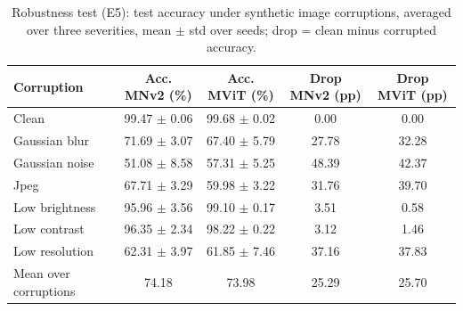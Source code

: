\begin{table}[!t]
\centering
\footnotesize
\caption{Robustness test (E5): test accuracy under synthetic image corruptions, averaged over three severities, mean $\pm$ std over seeds; drop = clean minus corrupted accuracy.}
\label{tab:robust}
\begin{tabular}{lcccc}
\toprule
Corruption & Acc. MNv2 (\%) & Acc. MViT (\%) & Drop MNv2 (pp) & Drop MViT (pp) \\
\midrule
Clean & 99.47 $\pm$ 0.06 & 99.68 $\pm$ 0.02 & 0.00 & 0.00 \\
Gaussian blur & 71.69 $\pm$ 3.07 & 67.40 $\pm$ 5.79 & 27.78 & 32.28 \\
Gaussian noise & 51.08 $\pm$ 8.58 & 57.31 $\pm$ 5.25 & 48.39 & 42.37 \\
Jpeg & 67.71 $\pm$ 3.29 & 59.98 $\pm$ 3.22 & 31.76 & 39.70 \\
Low brightness & 95.96 $\pm$ 3.56 & 99.10 $\pm$ 0.17 & 3.51 & 0.58 \\
Low contrast & 96.35 $\pm$ 2.34 & 98.22 $\pm$ 0.22 & 3.12 & 1.46 \\
Low resolution & 62.31 $\pm$ 3.97 & 61.85 $\pm$ 7.46 & 37.16 & 37.83 \\
Mean over corruptions & 74.18 & 73.98 & 25.29 & 25.70 \\
\bottomrule
\end{tabular}
\end{table}
